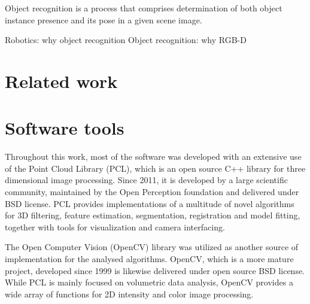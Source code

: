 Object recognition is a process that comprises determination of both object instance presence and its pose in a given scene image.   

Robotics: why object recognition
Object recognition: why RGB-D




\section{Related work}
\label{sec:related}



\section{Software tools}
\label{sec:software}

Throughout this work, most of the software was developed with an extensive use of the Point Cloud Library (PCL)\cite{Rusu_ICRA2011_PCL}, which is an open source C++ library for three dimensional image processing. Since 2011, it is developed by a large scientific community, maintained by the Open Perception foundation and delivered under BSD license. PCL provides implementations of a multitude of novel algorithms for 3D filtering, feature estimation, segmentation, registration and model fitting, together with tools for visualization and camera interfacing.

The Open Computer Vision (OpenCV)\cite{OpenCV} library was utilized as another source of implementation for the analysed algorithms. OpenCV, which is a more mature project, developed since 1999 is likewise delivered under open source BSD license. While PCL is mainly focused on volumetric data analysis, OpenCV provides a wide array of functions for 2D intensity and color image processing.








